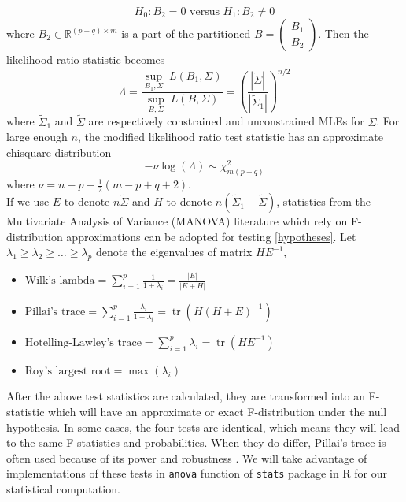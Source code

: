 \documentclass[12pt]{article}
\begin{document}
\begin{equation}\label{hypotheses}
    H_0: B_2=0 \text{ versus } H_1: B_2\ne 0
\end{equation}
where $B_2\in \mathbb{R}^{(p-q)\times m}$ is a part of the partitioned $B=\begin{pmatrix}B_1 \\ B_2\end{pmatrix}$. Then the likelihood ratio statistic becomes
\begin{equation}
\Lambda=\frac{\underset{B_1,\Sigma}\sup\; L(B_1,\Sigma)}{\underset{B,\Sigma}\sup\; L(B,\Sigma)}=(\frac{|\tilde{\Sigma}|}{|\tilde{\Sigma}_1|})^{n/2}
\end{equation}
where $\tilde{\Sigma}_1$ and $\tilde{\Sigma}$ are respectively constrained and unconstrained MLEs for $\Sigma$. For large enough $n$, the modified likelihood ratio test statistic has an approximate chisquare distribution
\begin{equation}
-\nu \log(\Lambda) \sim \chi^2_{m(p-q)}
\end{equation}
where $\nu=n-p-\frac{1}{2}(m-p+q+2)$. \\
If we use $E$ to denote $n\tilde{\Sigma}$ and $H$ to denote $n(\tilde{\Sigma}_1-\tilde{\Sigma})$, statistics from the Multivariate Analysis of Variance (MANOVA) literature \cite{warne2014primer} which rely on F-distribution approximations can be adopted for testing \eqref{hypotheses}. Let $\lambda_1\ge\lambda_2\ge\dots\ge\lambda_p$ denote the eigenvalues of matrix $HE^{-1}$,
\begin{itemize}
    \item $\text{Wilk's lambda}=\sum_{i=1}^p \frac{1}{1+\lambda_i}=\frac{|E|}{|E+H|}$ 
    \item $\text{Pillai's trace}=\sum_{i=1}^p \frac{\lambda_i}{1+\lambda_i}=\operatorname{tr}(H(H+E)^{-1})$
    \item $\text{Hotelling-Lawley's trace}=\sum_{i=1}^p \lambda_i=\operatorname{tr}(HE^{-1})$
    \item $\text{Roy's largest root}=\max(\lambda_i)$
\end{itemize}
After the above test statistics are calculated, they are transformed into an F-statistic which will have an approximate or exact F-distribution under the null hypothesis. In some cases, the four tests are identical, which means they will lead to the same F-statistics and probabilities. When they do differ, Pillai's trace is often used because of its power and robustness \cite{carey1998multivariate}. We will take advantage of implementations of these tests in \lstinline{anova} function of \lstinline{stats} package in R \cite{team2013r} for our statistical computation.
\end{document}
